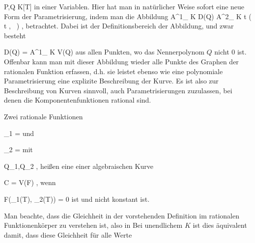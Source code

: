 \mavergleichskette
{\vergleichskette
{ P,Q
}
{ \in }{ K[T]
}
{  }{
}
{    }{
}
{   }{
}
}
{}{}{}
in einer Variablen. Hier hat man in natürlicher Weise sofort eine neue Form der Parametrisierung, indem man die Abbildung
\maabbeledisp {} { {\mathbb A}^{1}_{ K }  \supseteq D(Q) } { {\mathbb A}^{2}_{ K }
} { t } { \left(  t   , \,   {  }                   \right)
} {,}
betrachtet. Dabei ist
 der Definitionsbereich der Abbildung, und zwar besteht

\mavergleichskettedisp
{\vergleichskette
{ D(Q)
}
{ =} { {\mathbb A}^{1}_{ K }  \setminus V(Q)
}
{ } {
}
{ } {
}
{ } {
}
}
{}{}{}
aus allen Punkten, wo das Nennerpolynom $Q$ nicht $0$ ist. Offenbar kann man mit dieser Abbildung wieder alle Punkte des Graphen der rationalen Funktion erfassen, d.h. sie leistet ebenso wie eine polynomiale Parametrisierung eine explizite Beschreibung der Kurve. Es ist also zur Beschreibung von Kurven sinnvoll, auch Parametrisierungen zuzulassen, bei denen die Komponentenfunktionen rational sind.


{}
{





Zwei rationale Funktionen

\mavergleichskette
{\vergleichskette
{ \varphi_1
}
{ = }{ 
}
{  }{
}
{    }{
}
{   }{
}
}
{}{}{}
und

\mavergleichskette
{\vergleichskette
{ \varphi_2
}
{ = }{ 
}
{  }{
}
{    }{
}
{   }{
}
}
{}{}{}
mit

 {}
 {Q_1,Q_2 } {}
 {} {} {} {,}
heißen eine  einer algebraischen Kurve

\mavergleichskette
{\vergleichskette
{ C
}
{ = }{ V(F)
}
{  }{
}
{    }{
}
{   }{
}
}
{}{}{}
 {} {,}
wenn

\mavergleichskettedisp
{\vergleichskette
{ F(\varphi_1(T), \varphi_2(T))
}
{ =} { 0
}
{ } {
}
{ } {
}
{ } {
}
}
{}{}{}
ist und
 nicht konstant ist.





}

Man beachte, dass die Gleichheit in der vorstehenden Definition im rationalen Funktionenkörper zu verstehen ist, also in
 Bei unendlichem $K$ ist dies äquivalent damit, dass diese Gleichheit für alle Werte

